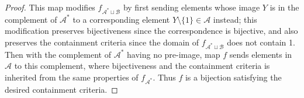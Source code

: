 \documentclass{article}
\begin{document}
\begin{proof}
    This map modifies $f_{\mathcal{A}^*\sqcup\mathcal{B}}$ by first sending
    elements whose image $Y$ is in the complement of $\mathcal{A}^*$ to a
    corresponding element $Y\setminus\{1\}\in\mathcal{A}$ instead; this
    modification preserves bijectiveness since the correspondence is
    bijective, and also preserves the containment criteria since the domain
    of $f_{\mathcal{A}^*\sqcup\mathcal{B}}$ does not contain 1. Then with
    the complement of $\mathcal{A}^*$ having no pre-image, map $f$ sends
    elements in $\mathcal{A}$ to this complement, where bijectiveness
    and the containment criteria is inherited from the same properties of
    $f_{\mathcal{A}^*}$. Thus $f$ is a bijection satisfying the desired
    containment criteria. 
  \end{proof}
\end{document}
